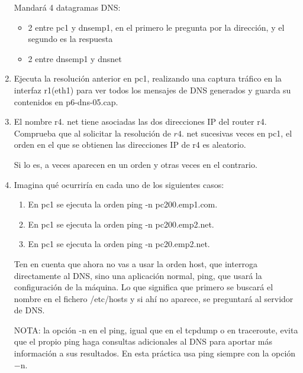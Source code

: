 \documentclass[12pt, a4paper]{report}
\begin{document}
\begin{enumerate}
  Mandará 4 datagramas DNS:
	\begin{itemize}
		\item 2 entre pc1 y dnsemp1, en el primero le pregunta por la dirección, y el segundo es la respuesta
		\item 2 entre dnsemp1 y dnsnet
	\end{itemize}

  \item Ejecuta la resolución anterior en pc1, realizando una captura tráfico en la interfaz r1(eth1) para ver todos los mensajes de DNS generados y guarda su contenidos en p6-dns-05.cap.
  \item El nombre r4. net tiene asociadas las dos direcciones IP del router r4. Comprueba que al solicitar la resolución de $r 4$. net sucesivas veces en pc1, el orden en el que se obtienen las direcciones IP de r4 es aleatorio.
  
  Si lo es, a veces aparecen en un orden y otras veces en el contrario.

  \item Imagina qué ocurriría en cada uno de los siguientes casos:


	\begin{enumerate}[label=\alph*]
		\item En pc1 se ejecuta la orden ping -n pc200.emp1.com.
		\item En pc1 se ejecuta la orden ping -n pc200.emp2.net.
		\item En pc1 se ejecuta la orden ping -n pc20.emp2.net.
	\end{enumerate}
	
	Ten en cuenta que ahora no vas a usar la orden host, que interroga directamente al DNS, sino una aplicación normal, ping, que usará la configuración de la máquina. Lo que significa que primero se buscará el nombre en el fichero /etc/hosts y si ahí no aparece, se preguntará al servidor de DNS.
	
	NOTA: la opción -n en el ping, igual que en el tcpdump o en traceroute, evita que el propio ping haga consultas adicionales al DNS para aportar más información a sus resultados. En esta práctica usa ping siempre con la opción $-\mathrm{n}$.
	

\end{enumerate}
\end{document}

